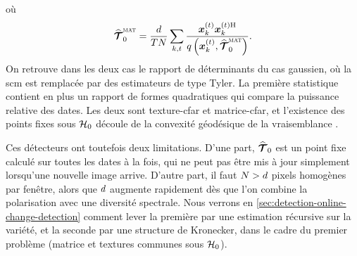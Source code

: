 où
\begin{equation*}
  \widehat{\bm{\mathcal{T}}}_0^{\textsc{mat}}
  =
  \frac{d}{TN}\sum_{k,t}
  \frac{\boldsymbol{x}_k^{(t)}\boldsymbol{x}_k^{(t)\mathrm{H}}}{q\left(\boldsymbol{x}_k^{(t)},\widehat{\bm{\mathcal{T}}}_0^{\textsc{mat}}\right)}.
\end{equation*}
On retrouve dans les deux cas le rapport de déterminants du cas gaussien, où la scm est remplacée par des estimateurs de type Tyler. La première statistique contient en plus un rapport de formes quadratiques qui compare la puissance relative des dates. Les deux sont texture-cfar et matrice-cfar, et l'existence des points fixes sous $\mathcal{H}_0$ découle de la convexité géodésique de la vraisemblance \cite{TSP19}.

Ces détecteurs ont toutefois deux limitations. D'une part, $\widehat{\bm{\mathcal{T}}}_0$ est un point fixe calculé sur toutes les dates à la fois, qui ne peut pas être mis à jour simplement lorsqu'une nouvelle image arrive. D'autre part, il faut $N>d$ pixels homogènes par fenêtre, alors que $d$ augmente rapidement dès que l'on combine la polarisation avec une diversité spectrale. Nous verrons en \cref{sec:detection-online-change-detection} comment lever la première par une estimation récursive sur la variété, et la seconde par une structure de Kronecker, dans le cadre du premier problème (matrice et textures communes sous $\mathcal{H}_0$).



